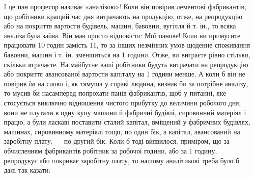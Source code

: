 І це пан професор називає «аналізою»! Коли він повірив лементові фабрикантів, що робітники кращий
час дня витрачають
на продукцію, отже, на репродукцію або на покриття вартости будівель, машин, бавовни, вугілля й т.
ін., то всяка аналіза
була зайва. Він мав просто відповісти: Мої панове! Коли ви примусите працювати 10 годин замість 11, то за інших незмінних
умов щоденне споживання бавовни, машин і т. ін. зменшиться на 1 години. Отже, ви виграєте
рівно стільки, скільки втрачаєте. На майбутнє ваші робітники будуть витрачати на репродукцію
або покриття авансованої вартости капіталу на 1 години менше. А коли б він не повірив їм на
слово і, як тямуща у справі людина, визнав би за потрібне аналізу, то мусив би насамперед попрохати
панів фабрикантів, щоб у питанні, яке стосується
виключно відношення чистого прибутку до величини робочого дня, вони не плутали в одну купу машини й
фабричні будівлі,
сировинний матеріял і працю, а були ласкаві поставити сталий капітал, вміщений у фабричних будівлях,
машинах, сировинному матеріялі тощо, по один бік, а капітал, авансований на заробітну
плату, — по другий бік. Коли б тоді виявилося, приміром, що за обчисленням фабрикантів робітник за
 робочої години, або за 1 годину, репродукує або покриває заробітну плату, то нашому
аналітикові треба було б далі так казати:

